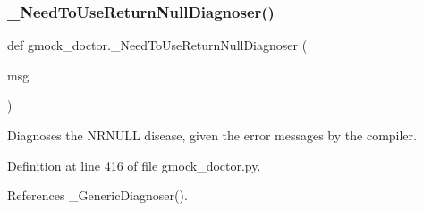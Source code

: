 \subsubsection{\texorpdfstring{\+\_\+\+Need\+To\+Use\+Return\+Null\+Diagnoser()}{\_NeedToUseReturnNullDiagnoser()}}
{\footnotesize\ttfamily def gmock\+\_\+doctor.\+\_\+\+Need\+To\+Use\+Return\+Null\+Diagnoser (\begin{DoxyParamCaption}\item[{}]{msg }\end{DoxyParamCaption})\hspace{0.3cm}{\ttfamily [private]}}

\begin{DoxyVerb}Diagnoses the NRNULL disease, given the error messages by the compiler.\end{DoxyVerb}
 

Definition at line 416 of file gmock\+\_\+doctor.\+py.



References \+\_\+\+Generic\+Diagnoser().


